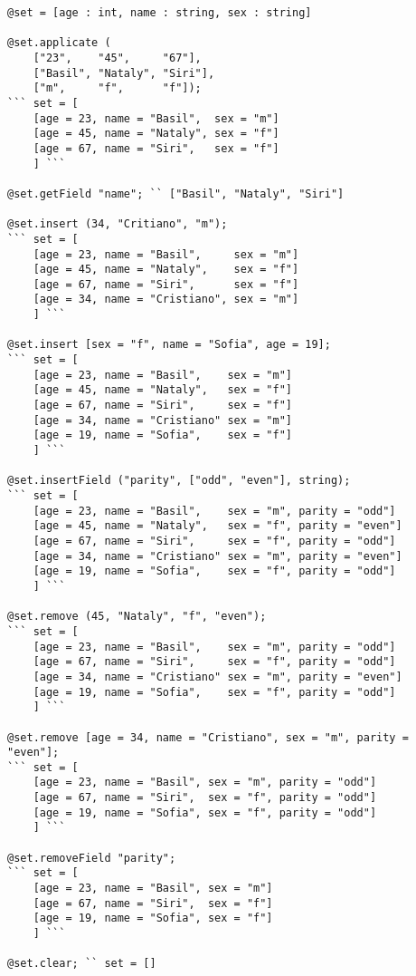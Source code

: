 \begin{sourcecode}
\label{setmethods}
\begin{verbatim}
@set = [age : int, name : string, sex : string]

@set.applicate (
	["23",    "45",     "67"],
	["Basil", "Nataly", "Siri"],
	["m",     "f",      "f"]);
``` set = [
    [age = 23, name = "Basil",  sex = "m"]
	[age = 45, name = "Nataly", sex = "f"]
	[age = 67, name = "Siri",   sex = "f"]
	] ```

@set.getField "name"; `` ["Basil", "Nataly", "Siri"]

@set.insert (34, "Critiano", "m");
``` set = [
    [age = 23, name = "Basil",     sex = "m"]
	[age = 45, name = "Nataly",    sex = "f"]
	[age = 67, name = "Siri",      sex = "f"]
	[age = 34, name = "Cristiano", sex = "m"]
	] ```

@set.insert [sex = "f", name = "Sofia", age = 19];
``` set = [
    [age = 23, name = "Basil",    sex = "m"]
	[age = 45, name = "Nataly",   sex = "f"]
	[age = 67, name = "Siri",     sex = "f"]
	[age = 34, name = "Cristiano" sex = "m"]
	[age = 19, name = "Sofia",    sex = "f"]
	] ```

@set.insertField ("parity", ["odd", "even"], string);
``` set = [
    [age = 23, name = "Basil",    sex = "m", parity = "odd"]
	[age = 45, name = "Nataly",   sex = "f", parity = "even"]
	[age = 67, name = "Siri",     sex = "f", parity = "odd"]
	[age = 34, name = "Cristiano" sex = "m", parity = "even"]
	[age = 19, name = "Sofia",    sex = "f", parity = "odd"]
	] ```

@set.remove (45, "Nataly", "f", "even");
``` set = [
    [age = 23, name = "Basil",    sex = "m", parity = "odd"]
	[age = 67, name = "Siri",     sex = "f", parity = "odd"]
	[age = 34, name = "Cristiano" sex = "m", parity = "even"]
	[age = 19, name = "Sofia",    sex = "f", parity = "odd"]
	] ```

@set.remove [age = 34, name = "Cristiano", sex = "m", parity = "even"];
``` set = [
    [age = 23, name = "Basil", sex = "m", parity = "odd"]
	[age = 67, name = "Siri",  sex = "f", parity = "odd"]
	[age = 19, name = "Sofia", sex = "f", parity = "odd"]
	] ```

@set.removeField "parity";
``` set = [
    [age = 23, name = "Basil", sex = "m"]
	[age = 67, name = "Siri",  sex = "f"]
	[age = 19, name = "Sofia", sex = "f"]
	] ```

@set.clear; `` set = []
\end{verbatim}
\end{sourcecode}

